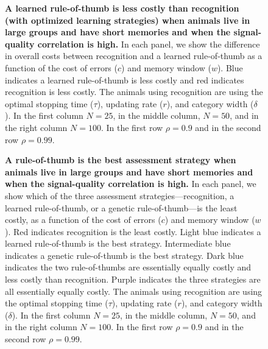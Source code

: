 \begin{figure}
\caption{\sffamily\small\textbf{A learned rule-of-thumb is less costly than recognition (with optimized learning strategies) when animals live in large groups and have short memories and when the signal-quality correlation is high.} In each panel, we show the difference in overall costs between recognition and a learned rule-of-thumb as a function of the cost of errors ($c$) and memory window ($w$). Blue indicates a learned rule-of-thumb is less costly and red indicates recognition is less costly. The animals using recognition are using the optimal stopping time ($\tau$), updating rate ($r$), and category width ($\delta$). In the first column $N=25$, in the middle column, $N=50$, and in the right column $N=100$. In the first row $\rho=0.9$ and in the second row $\rho=0.99$.}
\label{comparison}
\end{figure}

\begin{figure}
\caption{\sffamily\small\textbf{A rule-of-thumb is the best assessment strategy when animals live in large groups and have short memories and when the signal-quality correlation is high.} In each panel, we show which of the three assessment strategies---recognition, a learned rule-of-thumb, or a genetic rule-of-thumb---is the least costly, as a function of the cost of errors ($c$) and memory window ($w$). Red indicates recognition is the least costly. Light blue indicates a learned rule-of-thumb is the best strategy. Intermediate blue indicates a genetic rule-of-thumb is the best strategy. Dark blue indicates the two rule-of-thumbs are essentially equally costly and less costly than recognition. Purple indicates the three strategies are all essentially equally costly. The animals using recognition are using the optimal stopping time ($\tau$), updating rate ($r$), and category width ($\delta$). In the first column $N=25$, in the middle column, $N=50$, and in the right column $N=100$. In the first row $\rho=0.9$ and in the second row $\rho=0.99$.}
\label{best}
\end{figure}

